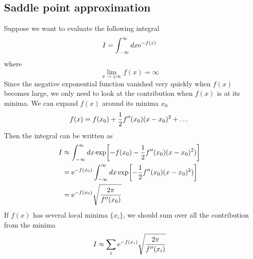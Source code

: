 \documentclass[10pt]{article}
\begin{document}
	\subsection{Saddle point approximation}

	Suppose we want to evaluate the following integral
	\begin{equation}
		I = \int_{-\infty}^{\infty} dx {\mathrm{e}}^{- f(x)}
	\end{equation}
	where
	\begin{equation}
		\lim_{x \to \pm \infty}f(x) = \infty
	\end{equation}
	Since the negative exponential function vanished very quickly when $f(x)$ becomes large, we only need to look at the contribution when $f(x)$ is at its minima. We can expand $f(x)$ around its minima $x_0$
	\begin{equation}
		f(x) = f(x_0) + \frac{1}{2} f''(x_0)(x-x_0)^2 + \dots
	\end{equation}
	Then the integral can be written as
	\begin{align*}
		I &\approx \int_{-\infty}^{\infty} dx \exp[{- f(x_0) - \frac{1}{2} f''(x_0)(x-x_0)^2})] \\
		&= {\mathrm{e}}^{-f(x_0)} \int_{-\infty}^{\infty} dx \exp[{- \frac{1}{2} f''(x_0)(x-x_0)^2})] \\
		&= {\mathrm{e}}^{-f(x_0)} \sqrt{\frac{2\pi}{f''(x_0)}}
	\end{align*}
	If $f(x)$ has several local minima $\{x_i\}$, we should sum over all the contribution from the minima
	\begin{equation}
		I \approx \sum_i {\mathrm{e}}^{-f(x_i)} \sqrt{\frac{2\pi}{f''(x_i)}}
	\end{equation}
\end{document}
